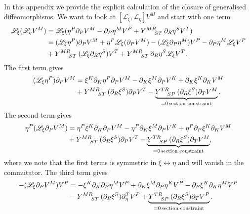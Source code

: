 \label{app:GenDiffComm}
In this appendix we provide the explicit calculation of the closure of generalised diffeomorphisms. We want to look at $[\mathscr{L}_\xi,\mathscr{L}_\eta] V^M$ and start with one term 
\begin{equation}
    \begin{aligned}
        \mathscr{L}_{\xi}(\mathscr{L}_\eta V^M) &= \mathscr{L}_\xi(\eta^P\pd_PV^M-\pd_P\eta^MV^P+\tensor{Y}{^{MR}_{ST}}\pd_R\eta^S V^T)\\
        &= (\mathscr{L}_\xi \eta^P)\pd_PV^M+\eta^P\mathscr{L}_\xi(\pd_PV^M)-(\mathscr{L}_\xi\pd_P\eta^M)V^P-\pd_P\eta^M\mathscr{L}_\xi V^P\\
        &+\tensor{Y}{^{MR}_{ST}}(\mathscr{L}_\xi\pd_R\eta^S)V^T+\tensor{Y}{^{MR}_{ST}}\pd_R\eta^S\mathscr{L}_\xi V^T.
    \end{aligned}
\end{equation}
The first term gives 
\begin{equation}
    \begin{aligned}
        (\mathscr{L}_\xi\eta^P)\pd_PV^M &= \xi^K\pd_K\eta^P\pd_PV^M-\pd_K\xi^M\pd_PV^K+\pd_K\xi^K\pd_KV^M\\
        &+\tensor{Y}{^{MR}_{ST}}(\pd_R\xi^S)\pd_PV^T-\underbrace{\tensor{Y}{^{TR}_{SP}}(\pd_R\xi^S)\pd_TV^M}_{=0\,\text{section constraint}}.
    \end{aligned}
\end{equation}
The second term gives 
\begin{equation}
    \begin{aligned}
        \eta^P(\mathscr{L}_\xi\pd_PV^M) &= \eta^P\xi^K\pd_K\pd_PV^M-\eta^P\pd_K\xi^M\pd_PV^K+\eta^P\pd_P\xi^K\pd_KV^M\\
        &+ \tensor{Y}{^{MR}_{ST}}(\pd_R\xi^S)\pd_PV^T-\underbrace{\tensor{Y}{^{TR}_{SP}}(\pd_R\xi^S)\pd_TV^M}_{=0\, \text{section constraint}},
    \end{aligned}
\end{equation}
where we note that the first terms is symmetric in $\xi\leftrightarrow\eta$ and will vanish in the commutator. The third term gives 
\begin{equation}
    \begin{aligned}
        -(\mathscr{L}_\xi\pd_PV^M)V^P&=-\xi^K\pd_K\pd_P\eta^MV^P+\pd_K\xi^M\pd_P\eta^KV^P-\pd_P\xi^K\pd_K\eta^MV^P\\
        &-\tensor{Y}{^{MR}_{ST}}(\pd_R\xi^S)\pd_\eta^TV^P+\underbrace{\tensor{Y}{^{TR}_{SP}}(\pd_R\xi^S)\pd_TV^P}_{=0\, \text{section constraint}}.
    \end{aligned}
\end{equation}
